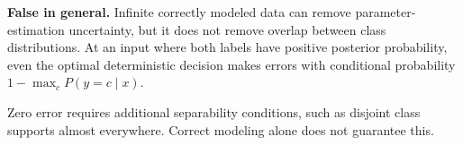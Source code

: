 \textbf{False in general.} Infinite correctly modeled data can remove parameter-estimation uncertainty, but it does not remove overlap between class distributions. At an input where both labels have positive posterior probability, even the optimal deterministic decision makes errors with conditional probability \(1-\max_c P(y=c\mid x)\).


Zero error requires additional separability conditions, such as disjoint class supports almost everywhere. Correct modeling alone does not guarantee this.
